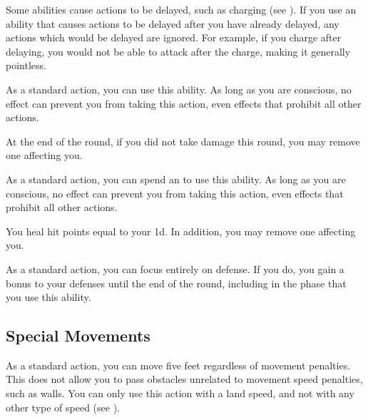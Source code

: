         Some abilities cause actions to be delayed, such as charging (see ).
        If you use an ability that causes actions to be delayed after you have already delayed, any actions which would be delayed are ignored.
        For example, if you charge after delaying, you would not be able to attack after the charge, making it generally pointless.

        \label{Desperate Recovery}
        As a standard action, you can use this ability.
        As long as you are conscious, no effect can prevent you from taking this action, even effects that prohibit all other actions.
        \begin{ability}
            \begin{spelleffects}
                \spelleffect At the end of the round, if you did not take damage this round, you may remove one  affecting you.
            \end{spelleffects}
        \end{ability}

        \label{Recover}
        As a standard action, you can spend an  to use this ability.
        As long as you are conscious, no effect can prevent you from taking this action, even effects that prohibit all other actions.
        \begin{ability}
            \begin{spelleffects}
                \spelleffect You heal hit points equal to your  \minus1d.
                In addition, you may remove one  affecting you.
            \end{spelleffects}
        \end{ability}

        \label{Total Defense}
        As a standard action, you can focus entirely on defense.
        If you do, you gain a  bonus to your defenses until the end of the round, including in the phase that you use this ability.

    \subsection{Special Movements}

         As a standard action, you can move five feet regardless of movement penalties.
        This does not allow you to pass obstacles unrelated to movement speed penalties, such as walls.
        You can only use this action with a land speed, and not with any other type of speed (see ).

